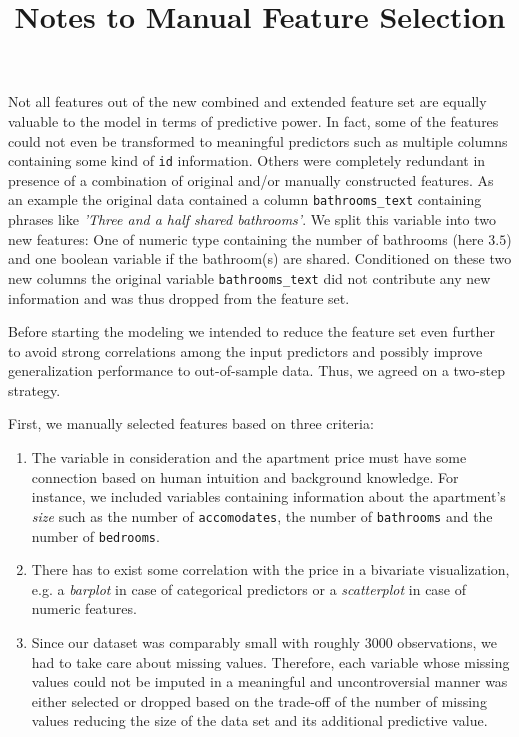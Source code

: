 \documentclass[12pt, letterpaper]{article}
\title{Notes to Manual Feature Selection}
\author{}
\date{}
\begin{document}
\maketitle
\tableofcontents
\setcounter{tocdepth}{3}

Not all features out of the new combined and extended feature set are equally valuable to the model in terms of predictive power.
In fact, some of the features could not even be transformed to meaningful predictors such as multiple columns containing some kind of \texttt{id} information.
Others were completely redundant in presence of a combination of original and/or manually constructed features.
As an example the original data contained a column \verb|bathrooms_text| containing phrases like \emph{'Three and a half shared bathrooms'}.
We split this variable into two new features: One of numeric type containing the number of bathrooms (here $3.5$) and one boolean variable if the bathroom(s) are shared.
Conditioned on these two new columns the original variable \verb|bathrooms_text| did not contribute any new information and was thus dropped from the feature set.

Before starting the modeling we intended to reduce the feature set even further to avoid strong correlations among the input predictors and possibly improve generalization performance to out-of-sample data.
Thus, we agreed on a two-step strategy.

First, we manually selected features based on three criteria:
\begin{enumerate}
    \item The variable in consideration and the apartment price must have some connection based on human intuition and background knowledge.
          For instance, we included variables containing information about the apartment's \emph{size} such as the number of \texttt{accomodates}, the number of \texttt{bathrooms} and the number of \texttt{bedrooms}.
    \item There has to exist some correlation with the price in a bivariate visualization, e.g. a \emph{barplot} in case of categorical predictors or a \emph{scatterplot} in case of numeric features.
    \item Since our dataset was comparably small with roughly $3000$ observations, we had to take care about missing values.
          Therefore, each variable whose missing values could not be imputed in a meaningful and uncontroversial manner was either selected or dropped based on the trade-off of the number of missing values reducing the size of the data set and its additional predictive value.
\end{enumerate}
\end{document}

